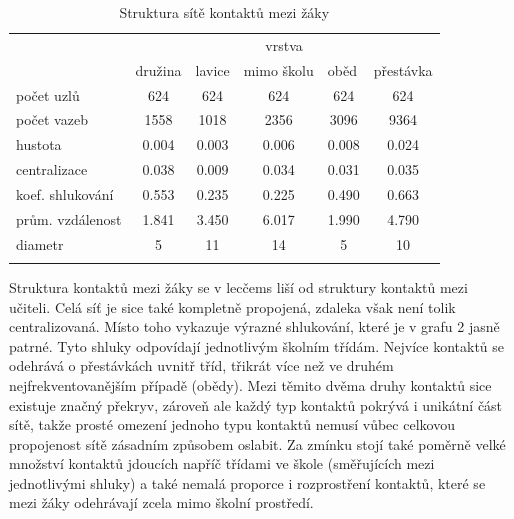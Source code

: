 \begin{table}[]
    \centering
    \caption{Struktura sítě kontaktů mezi žáky}
\begin{tabular}{lccccc}
\hline
                 & \multicolumn{5}{c}{vrstva}                                                                                                                           \\ 
                 & \multicolumn{1}{l}{družina} & \multicolumn{1}{l}{lavice} & \multicolumn{1}{l}{mimo školu} & \multicolumn{1}{l}{oběd} & \multicolumn{1}{l}{přestávka} \\ \hline
počet uzlů       & 624                         & 624                        & 624                            & 624                      & 624                           \\
počet vazeb      & 1558                        & 1018                       & 2356                           & 3096                     & 9364                          \\
hustota          & 0.004                       & 0.003                      & 0.006                          & 0.008                    & 0.024                         \\
centralizace     & 0.038                       & 0.009                      & 0.034                          & 0.031                    & 0.035                         \\
koef. shlukování & 0.553                       & 0.235                      & 0.225                          & 0.490                    & 0.663                         \\
prům. vzdálenost & 1.841                       & 3.450                      & 6.017                          & 1.990                    & 4.790                         \\
diametr          & 5                           & 11                         & 14                             & 5                        & 10                            \\ \hline
\label{tab:100-students}
\end{tabular}
\end{table}

Struktura kontaktů mezi žáky se v lecčems liší od struktury kontaktů mezi učiteli. Celá síť je sice také kompletně propojená, zdaleka však není tolik centralizovaná. Místo toho vykazuje výrazné shlukování, které je v grafu 2 jasně patrné. Tyto shluky odpovídají jednotlivým školním třídám. Nejvíce kontaktů se odehrává o přestávkách uvnitř tříd, třikrát více než ve druhém nejfrekventovanějším případě (obědy). Mezi těmito dvěma druhy kontaktů sice existuje značný překryv, zároveň ale každý typ kontaktů pokrývá i unikátní část sítě, takže prosté omezení jednoho typu kontaktů nemusí vůbec celkovou propojenost sítě zásadním způsobem oslabit. Za zmínku stojí také poměrně velké množství kontaktů jdoucích napříč třídami ve škole (směřujících mezi jednotlivými shluky) a také nemalá proporce i rozprostření kontaktů, které se mezi žáky odehrávají zcela mimo školní prostředí. 

